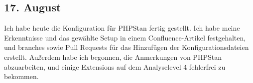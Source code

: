 \subsection{17. August}
Ich habe heute die Konfiguration für PHPStan fertig gestellt. Ich habe meine Erkenntnisse und das gewählte Setup in einem Confluence-Artikel festgehalten, und branches sowie Pull Requests für das Hinzufügen der Konfigurationsdateien erstellt. Außerdem habe ich begonnen, die Anmerkungen von PHPStan abzuarbeiten, und einige Extensions auf dem Analyselevel 4 fehlerfrei zu bekommen. 
